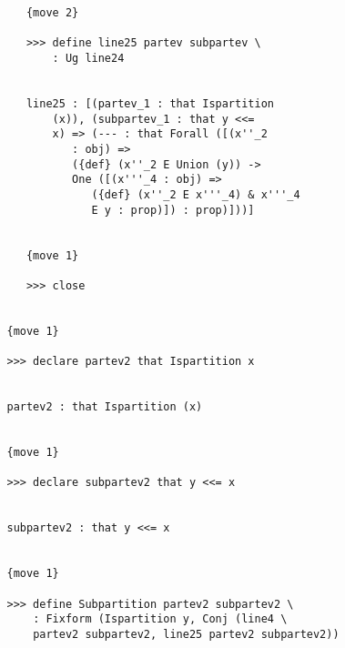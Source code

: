 \documentclass[12pt]{article}
\begin{document}
\begin{verbatim}
      {move 2}

      >>> define line25 partev subpartev \
          : Ug line24


      line25 : [(partev_1 : that Ispartition 
          (x)), (subpartev_1 : that y <<= 
          x) => (--- : that Forall ([(x''_2 
             : obj) => 
             ({def} (x''_2 E Union (y)) -> 
             One ([(x'''_4 : obj) => 
                ({def} (x''_2 E x'''_4) & x'''_4 
                E y : prop)]) : prop)]))]


      {move 1}

      >>> close


   {move 1}

   >>> declare partev2 that Ispartition x


   partev2 : that Ispartition (x)


   {move 1}

   >>> declare subpartev2 that y <<= x


   subpartev2 : that y <<= x


   {move 1}

   >>> define Subpartition partev2 subpartev2 \
       : Fixform (Ispartition y, Conj (line4 \
       partev2 subpartev2, line25 partev2 subpartev2))



\end{verbatim}
\end{document}
